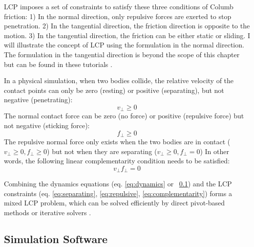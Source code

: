 LCP imposes a set of constraints to satisfy these three conditions of Columb friction: 1) In the normal direction, only repulsive forces are exerted to stop penetration. 2) In the tangential direction, the friction direction is opposite to the motion. 3) In the tangential direction, the friction can be either static or sliding. I will illustrate the concept of LCP using the formulation in the normal direction. The formulation in the tangential direction is beyond the scope of this chapter but can be found in these tutorials \cite{}. 

In a physical simulation, when two bodies collide, the relative velocity of the contact points can only be zero (resting) or positive (separating), but not negative (penetrating):
\begin{equation}
v_\perp\geq 0
\label{eq:separating}
\end{equation}
The normal contact force can be zero (no force) or positive (repulsive force) but not negative (sticking force):
\begin{equation}
f_\perp \geq 0
\label{eq:repulsive}
\end{equation}
The repulsive normal force only exists when the two bodies are in contact ($v_\perp\geq 0, f_\perp\geq 0$)
but not when they are separating ($v_\perp \geq 0, f_\perp =0$)
In other words, the following linear complementarity condition needs to be satisfied:
\begin{equation}
v_\perp f_\perp =0
\label{eq:complementarity}
\end{equation}

Combining the dynamics equations (eq. \ref{eq:dynamics} or ~\ref{}) and the LCP constraints (eq. \ref{eq:separating}, \ref{eq:repulsive}, \ref{eq:complementarity}) forms a mixed LCP problem, which can be solved efficiently by direct pivot-based methods \cite{} or iterative solvers \cite{}. 


\subsection{Simulation Software}

